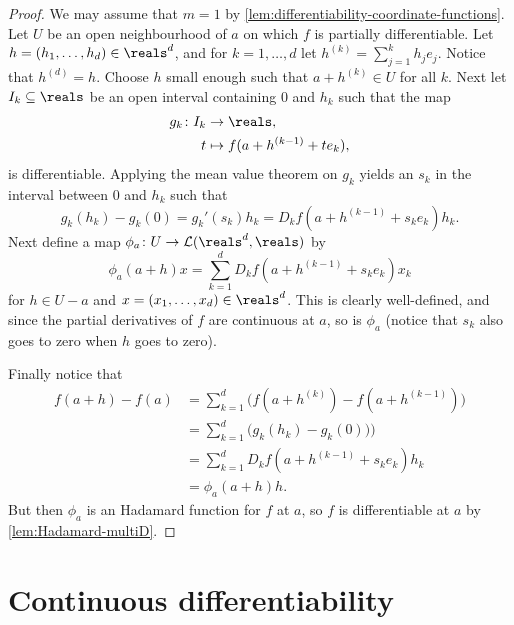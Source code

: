 \documentclass[article, a4paper, 11pt, oneside]{memoir}
\numberwithin{equation}{chapter}
\newcommand{\calL}{\mathcal{L}}
\begin{document}
\begin{proof}
    We may assume that $m = 1$ by \cref{lem:differentiability-coordinate-functions}. Let $U$ be an open neighbourhood of $a$ on which $f$ is partially differentiable. Let $h = (h_1, \ldots, h_d) \in \reals^d$, and for $k = 1, \ldots, d$ let $h^{(k)} = \sum_{j=1}^k h_j e_j$. Notice that $h^{(d)} = h$. Choose $h$ small enough such that $a + h^{(k)} \in U$ for all $k$. Next let $I_k \subseteq \reals$ be an open interval containing $0$ and $h_k$ such that the map
    \begin{align*}
        g_k \colon I_k &\to \reals, \\
        t &\mapsto f(a + h^{(k-1)} + t e_k),
    \end{align*}
    is differentiable. Applying the mean value theorem on $g_k$ yields an $s_k$ in the interval between $0$ and $h_k$ such that
    \begin{equation*}
        g_k(h_k) - g_k(0)
            = g_k'(s_k) h_k
            = D_k f(a + h^{(k-1)} + s_k e_k) h_k.
    \end{equation*}
    Next define a map $\phi_a \colon U \to \calL(\reals^d,\reals)$ by
    \begin{equation*}
        \phi_a(a+h)x
            = \sum_{k=1}^d D_k f(a + h^{(k-1)} + s_k e_k) x_k
    \end{equation*}
    for $h \in U - a$ and $x = (x_1, \ldots, x_d) \in \reals^d$. This is clearly well-defined, and since the partial derivatives of $f$ are continuous at $a$, so is $\phi_a$ (notice that $s_k$ also goes to zero when $h$ goes to zero).
    
    Finally notice that
    \begin{align*}
        f(a+h) - f(a)
            &= \sum_{k=1}^d \bigl( f(a + h^{(k)}) - f(a + h^{(k-1)}) \bigr) \\
            &= \sum_{k=1}^d \bigl( g_k(h_k) - g_k(0)) \bigr) \\
            &= \sum_{k=1}^d D_k f(a + h^{(k-1)} + s_k e_k) h_k \\
            &= \phi_a(a+h) h.
    \end{align*}
    But then $\phi_a$ is an Hadamard function for $f$ at $a$, so $f$ is differentiable at $a$ by \cref{lem:Hadamard-multiD}.
\end{proof}


\section{Continuous differentiability}
\end{document}
